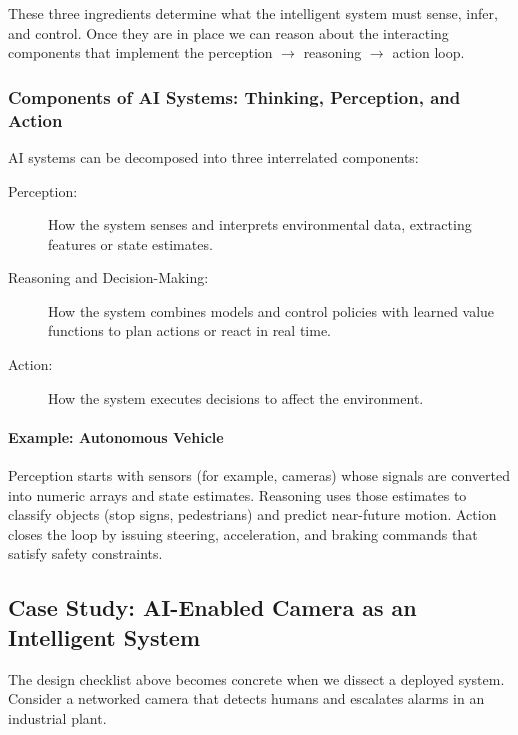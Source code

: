 These three ingredients determine what the intelligent system must sense, infer, and control. Once they are in place we can reason about the interacting components that implement the perception $\rightarrow$ reasoning $\rightarrow$ action loop.

\subsubsection{Components of AI Systems: Thinking, Perception, and Action}
\label{sec:intro_components_of_ai_systems_thinking_perception_and_action_sub}

AI systems can be decomposed into three interrelated components:

\begin{description}
\item[Perception:] How the system senses and interprets environmental data, extracting features or state estimates.
\item[Reasoning and Decision-Making:] How the system combines models and control policies with learned value functions to plan actions or react in real time.
\item[Action:] How the system executes decisions to affect the environment.
\end{description}

\paragraph{Example: Autonomous Vehicle}
Perception starts with sensors (for example, cameras) whose signals are converted into numeric arrays and state estimates. Reasoning uses those estimates to classify objects (stop signs, pedestrians) and predict near-future motion. Action closes the loop by issuing steering, acceleration, and braking commands that satisfy safety constraints.

\subsection{Case Study: AI-Enabled Camera as an Intelligent System}
\label{sec:intro_case_study_ai_enabled_camera_as_an_intelligent_system}

The design checklist above becomes concrete when we dissect a deployed system. Consider a networked camera that detects humans and escalates alarms in an industrial plant.

